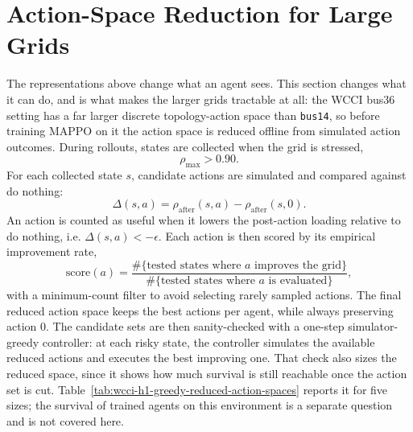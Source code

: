 \section{Action-Space Reduction for Large Grids}
\label{sec:wcci-action-space-reduction}

The representations above change what an agent sees. This section changes what
it can do, and is what makes the larger grids tractable at all: the WCCI bus36
setting has a far larger discrete topology-action space than \texttt{bus14}, so
before training MAPPO on it the action space is reduced offline from simulated
action outcomes. During rollouts, states are collected
when the grid is stressed,
\[
  \rho_{\max}>0.90.
\]
For each collected state \(s\), candidate actions are simulated and compared
against do nothing:
\[
  \Delta(s,a)=\rho_{\mathrm{after}}(s,a)
  -\rho_{\mathrm{after}}(s,0).
\]
An action is counted as useful when it lowers the post-action loading relative
to do nothing, i.e. \(\Delta(s,a)<-\epsilon\). Each action is then scored by its
empirical improvement rate,
\[
  \mathrm{score}(a)=
  \frac{\#\{\text{tested states where }a\text{ improves the grid}\}}
       {\#\{\text{tested states where }a\text{ is evaluated}\}},
\]
with a minimum-count filter to avoid selecting rarely sampled actions. The final
reduced action space keeps the best actions per agent, while always preserving
action \(0\). The candidate sets are then sanity-checked with a one-step
simulator-greedy controller: at each risky state, the controller simulates the
available reduced actions and executes the best improving one. That check also
sizes the reduced space, since it shows how much survival is still reachable
once the action set is cut. Table~\ref{tab:wcci-h1-greedy-reduced-action-spaces}
reports it for five sizes; the survival of trained agents on this environment is
a separate question and is not covered here.

